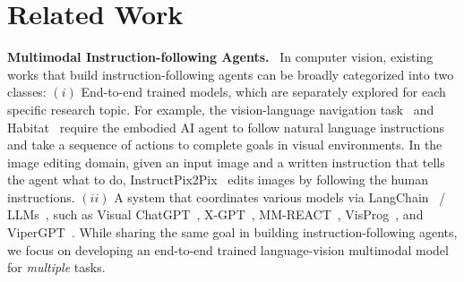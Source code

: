 \vspace{-2mm}
\section{Related Work}
\vspace{-2mm}

\textbf{Multimodal Instruction-following Agents.}
~In computer vision, existing works that build instruction-following agents can be broadly categorized into two classes: 
$(i)$ End-to-end trained models, which are separately explored for each specific research topic. For example, the vision-language navigation task~\cite{anderson2018vision,hao2020towards} and Habitat~\cite{szot2021habitat}  require the embodied AI agent to follow natural language instructions and take a sequence of actions to complete goals in visual environments. In the image editing domain, given an input image and a written instruction that tells the agent what to do, InstructPix2Pix~\cite{brooks2022instructpix2pix} edits images by following the human instructions. 
$(ii)$ A system that coordinates various models via LangChain~\cite{langchain} / LLMs~\cite{chatgpt}, such as
Visual ChatGPT~\cite{wu2023visual}, X-GPT~\cite{zou2022generalized}, MM-REACT~\cite{yang2023mm}, VisProg~\cite{gupta2022visual}, and ViperGPT~\cite{suris2023vipergpt}. While sharing the same goal in building instruction-following agents, we focus on developing an end-to-end trained language-vision multimodal model for \emph{multiple} tasks.

